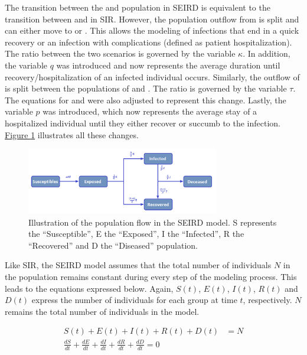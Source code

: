 The transition between the  and  population in SEIRD is equivalent to the transition
between  and  in SIR. However, the population outflow from  is split and can either move
to  or . This allows the modeling of infections that end in a quick recovery or an infection
with complications (defined as patient hospitalization). The ratio between the two scenarios is governed by the variable
$\kappa$. In addition, the variable $q$ was introduced and now represents the average duration until recovery/hospitalization of an
infected individual occurs. Similarly, the outflow of  is split between the populations of  and . The ratio is governed
by the variable $\tau$. The equations for  and  were also adjusted to represent this change. Lastly, the variable $p$ was
introduced, which now represents the average stay of a hospitalized individual until they either recover or succumb to the infection.
\hyperref[fig:SEIRD]{Figure \ref*{fig:SEIRD}} illustrates all these changes.\\

\begin{figure}
	\begin{center}
		\includegraphics[width=0.75\textwidth]{./figures/SEIRD.png}
		\caption[Scheme of the SEIRD model]{Illustration of the population flow in the SEIRD model. S represents the ``Susceptible'', E the ``Exposed'',
			I the ``Infected'', R the ``Recovered'' and D the ``Diseased'' population.}
		\label{fig:SEIRD}
	\end{center}
\end{figure}



Like SIR, the SEIRD model assumes that the total number of individuals $N$ in the population remains constant during every step
of the modeling process. This leads to the equations expressed below. Again, $S(t)$, $E(t)$, $I(t)$, $R(t)$ and $D(t)$ express
the number of individuals for each group at time $t$, respectively. $N$ remains the total number of individuals in the model.

\begin{align}
	\label{eq:SEIRD2}
	S(t) + E(t) + I(t) + R(t) + D(t) &= N \\
	\frac{dS}{dt} + \frac{dE}{dt}  + \frac{dI}{dt} + \frac{dR}{dt} + \frac{dD}{dt} = 0
\end{align}



